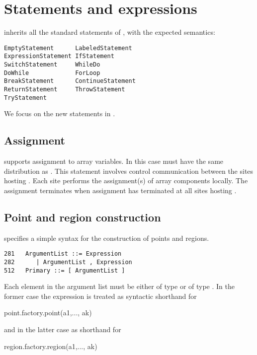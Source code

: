 \chapter{Statements and expressions}\label{XtenStatements}

\Xten{} inherits all the standard statements of \Java{}, with the expected semantics:

\begin{verbatim}
EmptyStatement      LabeledStatement  
ExpressionStatement IfStatement
SwitchStatement     WhileDo
DoWhile             ForLoop           
BreakStatement      ContinueStatement  
ReturnStatement     ThrowStatement
TryStatement
\end{verbatim}

We focus on the new statements in \Xten. 

\section{Assignment}\label{AssignmentStatement}

%

{}\Xten{} supports assignment  to array variables. In this
case  must have the same distribution  as . This
statement involves control communication between the sites hosting
. Each site performs the assignment(s) of array components
locally. The assignment terminates when assignment has terminated at
all sites hosting .


\section{Point and region construction}\label{point-syntax}
\Xten{} specifies a simple syntax for the construction of points and regions.
\begin{verbatim}
281   ArgumentList ::= Expression
282      | ArgumentList , Expression
512   Primary ::= [ ArgumentList ]
\end{verbatim}
Each element in the argument list must be either of type  or 
of type . In the former case the expression 
 is treated as syntactic shorthand for
\begin{xten}
point.factory.point(a1,..., ak)
\end{xten}
\noindent and in the latter case as shorthand for
\begin{xten}
region.factory.region(a1,..., ak)
\end{xten}

